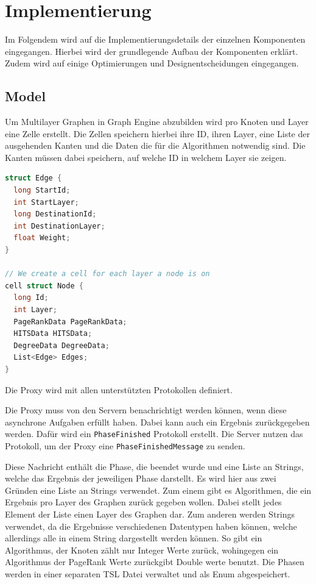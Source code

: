 \section{Implementierung}

Im Folgendem wird auf die Implementierungsdetails der einzelnen Komponenten eingegangen. Hierbei wird der grundlegende Aufbau der Komponenten erklärt.
Zudem wird auf einige Optimierungen und Designentscheidungen eingegangen.


\subsection{Model}

Um Multilayer Graphen in Graph Engine abzubilden wird pro Knoten und Layer eine Zelle erstellt. Die Zellen speichern hierbei ihre ID, ihren Layer, eine Liste der ausgehenden Kanten und die Daten die für die Algorithmen notwendig sind.
Die Kanten müssen dabei speichern, auf welche ID in welchem Layer sie zeigen.

\begin{lstlisting}[language=c,label={lst:tslModel}, caption={TSl Definition von Multilayer Knoten und Kanten.}]
struct Edge {
  long StartId;
  int StartLayer;
  long DestinationId;
  int DestinationLayer;
  float Weight;
}

// We create a cell for each layer a node is on
cell struct Node {
  long Id;
  int Layer;
  PageRankData PageRankData;
  HITSData HITSData;
  DegreeData DegreeData;
  List<Edge> Edges;
}
\end{lstlisting}

Die Proxy wird mit allen unterstützten Protokollen definiert. 

Die Proxy muss von den Servern benachrichtigt werden können, wenn diese asynchrone Aufgaben erfüllt haben. Dabei kann auch ein Ergebnis zurückgegeben werden.
Dafür wird ein \verb|PhaseFinished| Protokoll erstellt. Die Server nutzen das Protokoll, um der Proxy eine \verb|PhaseFinishedMessage| zu senden.

Diese Nachricht enthält die Phase, die beendet wurde und eine Liste an Strings, welche das Ergebnis der jeweiligen Phase darstellt. Es wird hier aus zwei Gründen eine Liste an Strings verwendet. Zum einem gibt es Algorithmen, die ein Ergebnis pro Layer des Graphen zurück gegeben wollen.
Dabei stellt jedes Element der Liste einen Layer des Graphen dar. Zum anderen werden Strings verwendet, da die Ergebnisse verschiedenen Datentypen haben können, welche allerdings alle in einem String dargestellt werden können. So gibt ein Algorithmus, der Knoten zählt nur Integer Werte zurück, wohingegen ein Algorithmus der PageRank Werte zurückgibt Double werte benutzt.
Die Phasen werden in einer separaten TSL Datei verwaltet und als Enum abgespeichert.

